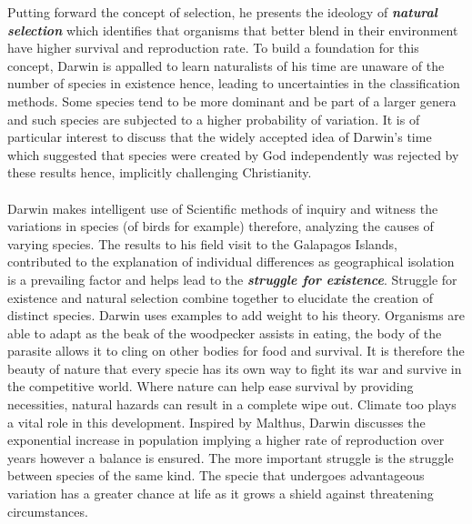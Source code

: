 \documentclass{article}
\begin{document}
	Putting forward the concept of selection, he presents the ideology of \textbf{\textit{natural selection}} which identifies that organisms that better blend in their environment have higher survival and reproduction rate. To build a foundation for this concept, Darwin is appalled to learn naturalists of his time are unaware of the number of species in existence hence, leading to uncertainties in the classification methods. Some species tend to be more dominant and be part of a larger genera and such species are subjected to a higher probability of variation. It is of particular interest to discuss that the widely accepted idea of Darwin's time which suggested that species were created by God independently was rejected by these results hence, implicitly challenging Christianity. \\ \\
	Darwin makes intelligent use of Scientific methods of inquiry and witness the variations in species (of birds for example) therefore, analyzing the causes of varying species. The results to his field visit to the Galapagos Islands, contributed to the explanation of individual differences as geographical isolation is a prevailing factor and helps lead to the \textbf{\textit{struggle for existence}}. Struggle for existence and natural selection combine together to elucidate the creation of distinct species. Darwin uses examples to add weight to his theory. Organisms are able to adapt as the beak of the woodpecker assists in eating, the body of the parasite allows it to cling on other bodies for food and survival. It is therefore the beauty of nature that every specie has its own way to fight its war and survive in the competitive world. Where nature can help ease survival by providing necessities, natural hazards can result in a complete wipe out. Climate too plays a vital role in this development. Inspired by Malthus, Darwin discusses the exponential increase in population implying a higher rate of reproduction over years however a balance is ensured. The more important struggle is the struggle between species of the same kind. The specie that undergoes advantageous variation has a greater chance at life as it grows a shield against threatening circumstances. \\ \\
\end{document}

